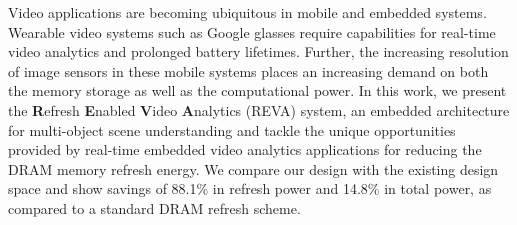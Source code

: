 Video applications are becoming ubiquitous in mobile and embedded systems. Wearable video systems such as Google glasses require capabilities for real-time video analytics and prolonged battery lifetimes. Further, the increasing resolution of image sensors in these mobile systems places an increasing demand on both the memory storage as well as the computational power. In this work, we present the \textbf{R}efresh \textbf{E}nabled \textbf{V}ideo \textbf{A}nalytics (REVA) system, an embedded architecture for multi-object scene understanding and tackle the unique opportunities provided by real-time embedded video analytics applications for reducing the DRAM memory refresh energy. We compare our design with the existing design space and show savings of 88.1\% in refresh power and 14.8\% in total power, as compared to a standard DRAM refresh scheme. 
